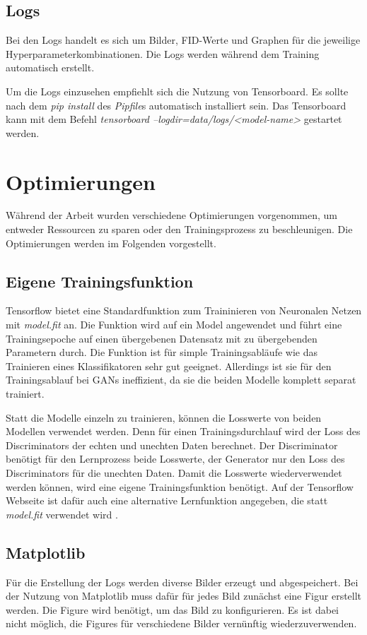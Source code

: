\subsection{Logs}
Bei den Logs handelt es sich um Bilder, FID-Werte und Graphen für die jeweilige Hyperparameterkombinationen.
Die Logs werden während dem Training automatisch erstellt.

Um die Logs einzusehen empfiehlt sich die Nutzung von Tensorboard.
Es sollte nach dem \textit{pip install} des \textit{Pipfile}s automatisch installiert sein.
Das Tensorboard kann mit dem Befehl \textit{tensorboard --logdir=data/logs/<model-name>} gestartet werden.

\section{Optimierungen}
Während der Arbeit wurden verschiedene Optimierungen vorgenommen, um entweder Ressourcen zu sparen oder den Trainingsprozess zu beschleunigen.
Die Optimierungen werden im Folgenden vorgestellt.

\subsection{Eigene Trainingsfunktion}
Tensorflow bietet eine Standardfunktion zum Traininieren von Neuronalen Netzen mit \textit{model.fit} an.
Die Funktion wird auf ein Model angewendet und führt eine Trainingsepoche auf einen übergebenen Datensatz mit zu übergebenden Parametern durch.
Die Funktion ist für simple Trainingsabläufe wie das Trainieren eines Klassifikatoren sehr gut geeignet.
Allerdings ist sie für den Trainingsablauf bei GANs ineffizient, da sie die beiden Modelle komplett separat trainiert.
\newline

Statt die Modelle einzeln zu trainieren, können die Losswerte von beiden Modellen verwendet werden.
Denn für einen Trainingsdurchlauf wird der Loss des Discriminators der echten und unechten Daten berechnet.
Der Discriminator benötigt für den Lernprozess beide Losswerte, der Generator nur den Loss des Discriminators für die unechten Daten.
Damit die Losswerte wiederverwendet werden können, wird eine eigene Trainingsfunktion benötigt.
Auf der Tensorflow Webseite ist dafür auch eine alternative Lernfunktion angegeben, die statt \textit{model.fit} verwendet wird \cite{tensorflow-gan-learn-step}.

\subsection{Matplotlib}
Für die Erstellung der Logs werden diverse Bilder erzeugt und abgespeichert.
Bei der Nutzung von Matplotlib muss dafür für jedes Bild zunächst eine Figur erstellt werden.
Die Figure wird benötigt, um das Bild zu konfigurieren.
Es ist dabei nicht möglich, die Figures für verschiedene Bilder vernünftig wiederzuverwenden.
\newline

